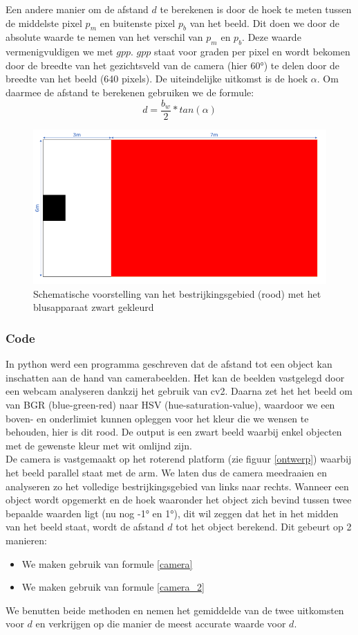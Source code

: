 \documentclass[kulak]{kulakarticle} %
\begin{document}
			Een andere manier om de afstand \(d\) te berekenen is door de hoek te meten tussen de middelste pixel \(p_m\) en buitenste pixel \(p_b\) van het beeld. Dit doen we door de absolute waarde te nemen van het verschil van \(p_m\) en \(p_b\). Deze waarde vermenigvuldigen we met \(gpp\). \(gpp\) staat voor graden per pixel en wordt bekomen door de breedte van het gezichtsveld van de camera (hier 60°) te delen door de breedte van het beeld (640 pixels). De uiteindelijke uitkomst is de hoek \(\alpha\). Om daarmee de afstand te berekenen gebruiken we de formule:
				\begin{equation} \label{camera_2}
					d = \frac{b_w}{2} * tan(\alpha)
				\end{equation}
				
				\begin{figure} [h!]
					\centering                
					\includegraphics[width = .5 \textwidth]{schematische voorstelling bestrijkingsgebied LATEX}
					\caption{Schematische voorstelling van het bestrijkingsgebied (rood) met het blusapparaat zwart gekleurd}
					\label{bestrijkingsgebied}
				\end{figure}

		\subsubsection{Code}
			In python werd een programma geschreven dat de afstand tot een object kan inschatten aan de hand van camerabeelden. Het kan de beelden vastgelegd door een webcam analyseren dankzij het gebruik van cv2. Daarna zet het het beeld om van BGR (blue-green-red) naar HSV (hue-saturation-value), waardoor we een boven- en onderlimiet kunnen opleggen voor het kleur die we wensen te behouden, hier is dit rood. De output is een zwart beeld waarbij enkel objecten met de gewenste kleur met wit omlijnd zijn.\\
			De camera is vastgemaakt op het roterend platform (zie figuur \ref{ontwerp}) waarbij het beeld parallel staat met de arm. We laten dus de camera meedraaien en analyseren zo het volledige bestrijkingsgebied van links naar rechts. Wanneer een object wordt opgemerkt en de hoek waaronder het object zich bevind tussen twee bepaalde waarden ligt (nu nog -1° en 1°), dit wil zeggen dat het in het midden van het beeld staat, wordt de afstand \(d\) tot het object berekend. Dit gebeurt op 2 manieren: 
				\begin{itemize}
					\item We maken gebruik van formule \ref{camera}
					\item We maken gebruik van formule \ref{camera_2}
				\end{itemize}
			We benutten beide methoden en nemen het gemiddelde van de twee uitkomsten voor \(d\) en verkrijgen op die manier de meest accurate waarde voor \(d\).
\end{document}
